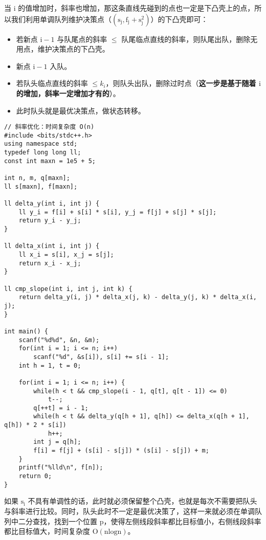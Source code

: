 \documentclass[UTF8]{article}
\begin{document}
当 $\mathrm{i}$ 的值增加时，斜率也增加，那这条直线先碰到的点也一定是下凸壳上的点，所以我们利用单调队列维护决策点（$\mathrm{(s_j, f_j + s_j ^ 2)}$）的下凸壳即可：

\begin{itemize}
	\item 若新点 $\mathrm{i - 1}$ 与队尾点的斜率 $\le$ 队尾临点直线的斜率，则队尾出队，删除无用点，维护决策点的下凸壳。
	\item 新点 $\mathrm{i - 1}$ 入队。
	\item 若队头临点直线的斜率 $\le k_i$，则队头出队，删除过时点（\textbf{这一步是基于随着 $\mathrm{i}$ 的增加，斜率一定增加才有的}）。
	\item 此时队头就是最优决策点，做状态转移。 
\end{itemize}

\begin{lstlisting}[caption=斜率优化 dp]
// 斜率优化：时间复杂度 O(n)
#include <bits/stdc++.h>
using namespace std;
typedef long long ll;
const int maxn = 1e5 + 5;

int n, m, q[maxn];
ll s[maxn], f[maxn];

ll delta_y(int i, int j) {
    ll y_i = f[i] + s[i] * s[i], y_j = f[j] + s[j] * s[j];
    return y_i - y_j;
}

ll delta_x(int i, int j) {
    ll x_i = s[i], x_j = s[j];
    return x_i - x_j;
}

ll cmp_slope(int i, int j, int k) {
    return delta_y(i, j) * delta_x(j, k) - delta_y(j, k) * delta_x(i, j);
}

int main() {
    scanf("%d%d", &n, &m);
    for(int i = 1; i <= n; i++)
        scanf("%d", &s[i]), s[i] += s[i - 1];
    int h = 1, t = 0;

    for(int i = 1; i <= n; i++) {
        while(h < t && cmp_slope(i - 1, q[t], q[t - 1]) <= 0)
            t--;
        q[++t] = i - 1;
        while(h < t && delta_y(q[h + 1], q[h]) <= delta_x(q[h + 1], q[h]) * 2 * s[i])
            h++;
        int j = q[h];
        f[i] = f[j] + (s[i] - s[j]) * (s[i] - s[j]) + m;
    }
    printf("%lld\n", f[n]);
    return 0;
}
\end{lstlisting}

如果 $\mathrm{s_i}$ 不具有单调性的话，此时就必须保留整个凸壳，也就是每次不需要把队头与斜率进行比较。同时，队头此时不一定是最优决策了，这样一来就必须在单调队列中二分查找，找到一个位置 $\mathrm{p}$，使得左侧线段斜率都比目标值小，右侧线段斜率都比目标值大，时间复杂度 $\mathrm{O(nlogn)}$。
\end{document}
